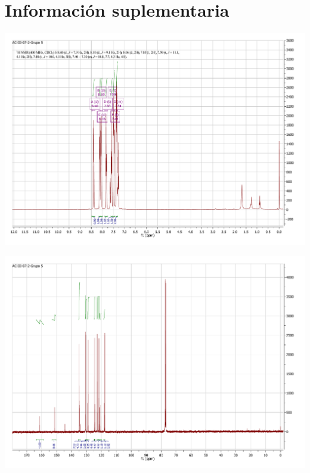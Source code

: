 \documentclass[fleqn,11pt]{SelfArx}
\begin{document}
	\onecolumn
	\section{Informaci\'on suplementaria}\label{sec: complementaria}
	
	{
		\begin{minipage}{0.9\textheight}
			\centering
			\includegraphics[height=0.65\textheight]{RMN/HRMN.pdf}
			\label{HRMN}
		\end{minipage}
	}

	{
		\begin{minipage}{0.9\textheight}
			\centering
			\includegraphics[height=0.65\textheight]{RMN/CRMN.pdf}
			\label{CRMN}
		\end{minipage}
	}
\end{document}
